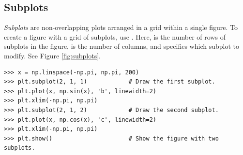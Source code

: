 \subsection*{Subplots} %

\emph{Subplots} are non-overlapping plots arranged in a grid within a single figure.
To create a figure with a grid of subplots, use .
Here,  is the number of rows of subplots in the figure,  is the number of columns, and  specifies which subplot to modify.
See Figure \ref{fig:subplots}.

\begin{lstlisting}
>>> x = np.linspace(-np.pi, np.pi, 200)
>>> plt.subplot(2, 1, 1)            # Draw the first subplot.
>>> plt.plot(x, np.sin(x), 'b', linewidth=2)
>>> plt.xlim(-np.pi, np.pi)
>>> plt.subplot(2, 1, 2)            # Draw the second subplot.
>>> plt.plot(x, np.cos(x), 'c', linewidth=2)
>>> plt.xlim(-np.pi, np.pi)
>>> plt.show()                      # Show the figure with two subplots.
\end{lstlisting}

